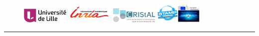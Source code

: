 \begin{titlepage}
\begin{center}
\vspace*{-2cm}
\begin{figure}[!htbp]
  \begin{center}
	\includegraphics[width=0.2\textwidth]{images/logo/lille1logo.png}\hspace{0.2cm}
	\includegraphics[width=0.2\textwidth]{images/logo/logo-inria-scientifique-couleur.jpg}\hspace{0.2cm}
	\includegraphics[width=0.2\textwidth]{images/logo/logoCRIStAL.pdf}\hspace{0.2cm}
	\includegraphics[width=0.2\textwidth]{images/logo/logo_readme_md.png}
  \end{center}
\end{figure}
\hrule



\end{center}
\end{titlepage}
